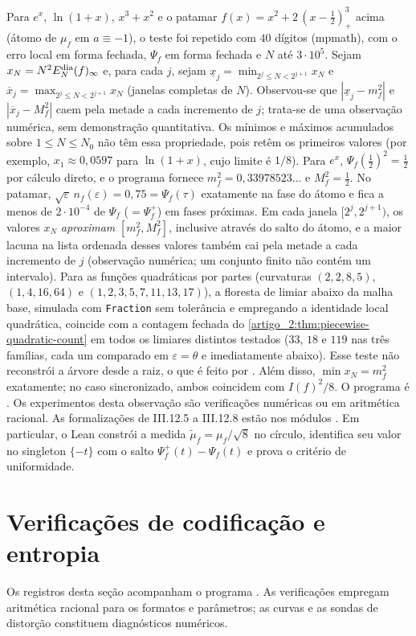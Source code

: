 \begin{remark}
Para $e^x$, $\ln(1+x)$, $x^3+x^2$ e o patamar $f(x)=x^2+2\,(x-\tfrac12)_+^3$
acima (átomo de $\mu_f$ em $a\equiv-1$), o teste foi repetido com $40$ dígitos
(mpmath), com o erro local em forma fechada, $\Psi_f$ em forma fechada e
$N$ até $3\cdot10^5$. Sejam $x_N=N^2E_N^{\rm dia}(f)_\infty$ e, para cada $j$, sejam
$\underline x_j=\min_{2^j\le N<2^{j+1}}x_N$ e $\overline x_j=\max_{2^j\le N<2^{j+1}}x_N$
(janelas completas de $N$). Observou-se que $|\underline x_j-m_f^2|$ e $|\overline x_j-M_f^2|$
caem pela metade a cada incremento de $j$; trata-se de uma observação numérica, sem
demonstração quantitativa. Os mínimos e máximos acumulados sobre $1\le N\le N_0$
não têm essa propriedade, pois retêm os primeiros valores (por exemplo,
$x_1\approx0{,}0597$ para $\ln(1+x)$, cujo limite é $1/8$). Para $e^x$, $\Psi_f(\tfrac12)^2=\tfrac12$ por
cálculo direto, e o programa fornece $m_f^2=0{,}33978523\ldots$ e $M_f^2=\tfrac12$.
No patamar, $\sqrt\varepsilon\,n_f(\varepsilon)=0{,}75=\Psi_f(\tau)$ exatamente na
fase do átomo e fica a menos de $2\cdot10^{-4}$ de $\Psi_f$ ($=\Psi_f^+$) em fases próximas.
Em cada janela $[2^j,2^{j+1})$, os valores $x_N$ \emph{aproximam}
$[m_f^2,M_f^2]$, inclusive através do salto do átomo, e a maior lacuna na lista
ordenada desses valores também cai pela metade a cada incremento de $j$
(observação numérica; um conjunto finito não contém um intervalo).
Para as funções quadráticas por partes (curvaturas
$(2,2,8,5)$, $(1,4,16,64)$ e $(1,2,3,5,7,11,13,17)$), a floresta de limiar
abaixo da malha base, simulada com \texttt{Fraction} sem tolerância e empregando a
identidade local quadrática, coincide com a contagem fechada do
\cref{artigo_2:thm:piecewise-quadratic-count} em todos os limiares distintos
testados ($33$, $18$ e $119$ nas três famílias, cada um comparado em $\varepsilon=\theta$
e imediatamente abaixo). Esse teste não reconstrói a árvore desde a raiz, o que
é feito por . Além disso,
$\min x_N=m_f^2$ exatamente; no caso sincronizado, ambos coincidem com
$I(f)^2/8$. O programa é . Os
experimentos desta observação são verificações numéricas ou em aritmética
racional. As formalizações de III.12.5 a III.12.8 estão nos módulos
. Em particular, o Lean
constrói a medida $\tilde\mu_f=\mu_f/\sqrt8$ no círculo, identifica seu valor no
singleton $\{-t\}$ com o salto $\Psi_f^+(t)-\Psi_f(t)$ e prova o critério
de uniformidade.
\end{remark}

\section{Verificações de codificação e entropia}
\label{artigo_2:sec:coding-validation}
Os registros desta seção acompanham o programa . As verificações empregam aritmética racional para os formatos e parâmetros; as curvas e as sondas de distorção constituem diagnósticos numéricos.


